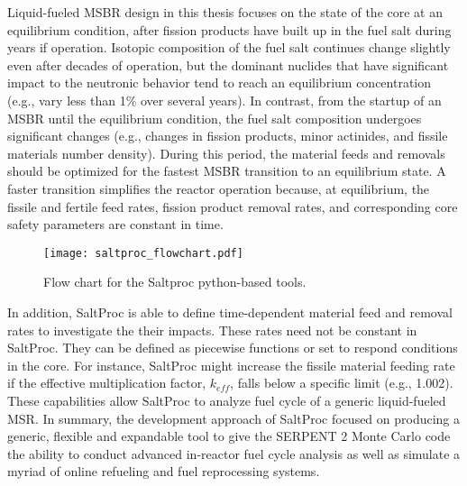 Liquid-fueled \gls{MSBR} design in this thesis focuses on the state of the core at an equilibrium condition, after fission products have
built up in the fuel salt during years if operation. Isotopic composition of the fuel salt continues change slightly even after decades
of operation, but the dominant nuclides that have significant impact to the neutronic behavior tend to reach an equilibrium concentration
(e.g., vary less than 1\% over several years). In contrast, from the startup of an \gls{MSBR} until the equilibrium condition,
the fuel salt composition undergoes significant changes (e.g., changes in fission products, minor actinides, and fissile
materials number density). During this period, the material feeds and removals should be optimized for the fastest \gls{MSBR} transition to an
equilibrium state. A faster transition simplifies the reactor operation because, at equilibrium, the fissile and fertile feed rates,
fission product removal rates, and corresponding core safety parameters are constant in time.

\begin{figure}[htp!] %
  \centering
  \vspace{-0.3em}
  \texttt{[image: saltproc\_flowchart.pdf]}
  \caption{Flow chart for the Saltproc python-based tools.}
  \vspace{-1.0em}
  \label{fig:saltproc_flow}
\end{figure}
\FloatBarrier

In addition, SaltProc is able to define time-dependent material feed and removal rates to investigate the their impacts. These rates need not be
constant in SaltProc. They can be defined as piecewise functions or set to respond conditions in the core. For instance, SaltProc might increase the
fissile material feeding rate if the effective multiplication factor, $k_{eff}$, falls below a specific limit (e.g., 1.002).
These capabilities allow SaltProc to analyze fuel cycle of a generic liquid-fueled \gls{MSR}. In summary, the development approach of SaltProc focused
on producing a generic, flexible and expandable tool to give the SERPENT 2 Monte Carlo code the ability to conduct advanced in-reactor
fuel cycle analysis as well as simulate a myriad of online refueling and fuel reprocessing systems.
